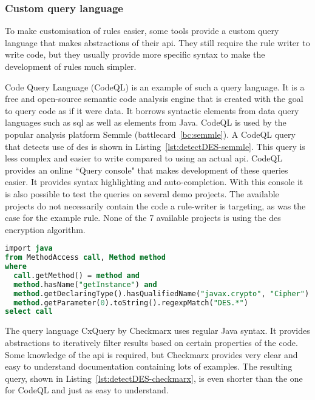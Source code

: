 \subsubsection{Custom query language}
To make customisation of rules easier, some tools provide a custom query language that makes abstractions of their \gls{api}.
They still require the rule writer to write code, but they usually provide more specific syntax to make the development of rules much simpler.

Code Query Language (CodeQL) is an example of such a query language.
It is a free and open-source semantic code analysis engine that is created with the goal to query code as if it were data.
It borrows syntactic elements from data query languages such as \gls{sql} as well as elements from Java.
CodeQL is used by the popular analysis platform Semmle (battlecard~\ref{bc:semmle}).
A CodeQL query that detects use of \gls{des} is shown in Listing~\ref{lst:detectDES-semmle}.
This query is less complex and easier to write compared to using an actual \gls{api}.
CodeQL provides an online ``Query console" that makes development of these queries easier.
It provides syntax highlighting and auto-completion.
With this console it is also possible to test the queries on several demo projects.
The available projects do not necessarily contain the code a rule-writer is targeting, as was the case for the example rule.
None of the 7 available projects is using the \gls{des} encryption algorithm.

\begin{lstlisting}[language={sql},caption={CodeQL query used by Semmle to find use of insecure algorithm DES.},label={lst:detectDES-semmle},abovecaptionskip=-0.0pt,xleftmargin=15pt]
import java
from MethodAccess call, Method method
where
  call.getMethod() = method and
  method.hasName("getInstance") and
  method.getDeclaringType().hasQualifiedName("javax.crypto", "Cipher") and
  method.getParameter(0).toString().regexpMatch("DES.*")
select call
\end{lstlisting}

The query language CxQuery by Checkmarx uses regular Java syntax.
It provides abstractions to iteratively filter results based on certain properties of the code.
Some knowledge of the \gls{api} is required, but Checkmarx provides very clear and easy to understand documentation containing lots of examples.
The resulting query, shown in Listing~\ref{lst:detectDES-checkmarx}, is even shorter than the one for CodeQL and just as easy to understand.

